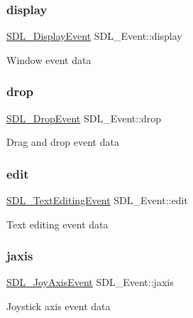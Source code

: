 \subsubsection{\texorpdfstring{display}{display}}
{\footnotesize\ttfamily \hyperlink{structSDL__DisplayEvent}{S\+D\+L\+\_\+\+Display\+Event} S\+D\+L\+\_\+\+Event\+::display}

Window event data \mbox{\label{unionSDL__Event_acff77bccbca65abbb876360a3f5209c9}} 
\subsubsection{\texorpdfstring{drop}{drop}}
{\footnotesize\ttfamily \hyperlink{structSDL__DropEvent}{S\+D\+L\+\_\+\+Drop\+Event} S\+D\+L\+\_\+\+Event\+::drop}

Drag and drop event data \mbox{\label{unionSDL__Event_a9a7e3b67b2654d4c5fc509676c6a7183}} 
\subsubsection{\texorpdfstring{edit}{edit}}
{\footnotesize\ttfamily \hyperlink{structSDL__TextEditingEvent}{S\+D\+L\+\_\+\+Text\+Editing\+Event} S\+D\+L\+\_\+\+Event\+::edit}

Text editing event data \mbox{\label{unionSDL__Event_ac4611acd0e9c675e67dc20919f0accb4}} 
\subsubsection{\texorpdfstring{jaxis}{jaxis}}
{\footnotesize\ttfamily \hyperlink{structSDL__JoyAxisEvent}{S\+D\+L\+\_\+\+Joy\+Axis\+Event} S\+D\+L\+\_\+\+Event\+::jaxis}

Joystick axis event data \mbox{\label{unionSDL__Event_ae433f511e3383d17f8fe02df745ee8f8}} 
